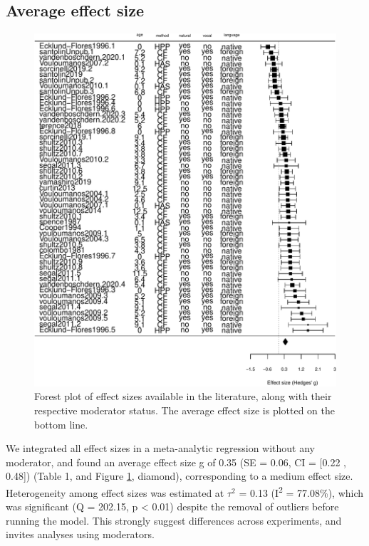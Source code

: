 \documentclass[
  english,
  man]{apa6}
\begin{document}
\hypertarget{average-effect-size}{%
\subsection{Average effect size}\label{average-effect-size}}

\begin{figure}
\centering
\includegraphics{MA_speech_pref_files/figure-latex/forest-1.pdf}
\caption{\label{fig:forest}Forest plot of effect sizes available in the literature, along with their respective moderator status. The average effect size is plotted on the bottom line.}
\end{figure}

We integrated all effect sizes in a meta-analytic regression without any moderator, and found an average effect size g of 0.35 (SE = 0.06, CI = {[}0.22 , 0.48{]}) (Table 1, and Figure \ref{fig:forest}, diamond), corresponding to a medium effect size.
Heterogeneity among effect sizes was estimated at \(\tau^2\) = 0.13 (I\textsuperscript{2} = 77.08\%), which was significant (Q = 202.15, p \textless{} 0.01) despite the removal of outliers before running the model. This strongly suggest differences across experiments, and invites analyses using moderators.
\end{document}
